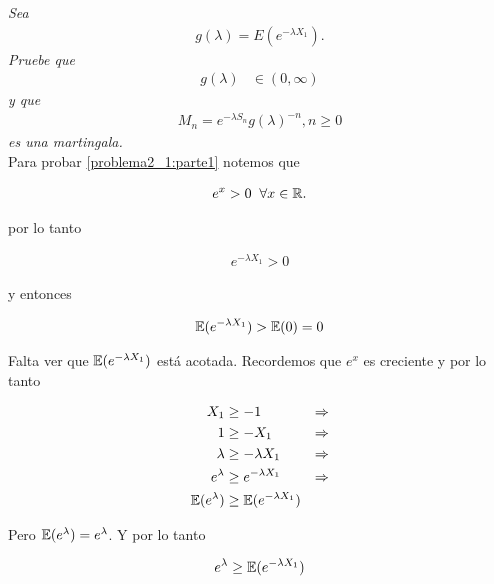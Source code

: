 \emph{
    Sea
        \begin{align}
                g(\lambda)=E(e^{- \lambda X_1}).
        \end{align} 
    Pruebe que 
    \null
        \begin{align}
                g(\lambda)    &\in (0,\infty)\label{problema2_1:parte1}
        \end{align}
    \null
    y que
    \null
        \begin{align}
                M_n=e^{-\lambda S_n}g(\lambda)^{-n},n\geq 0
        \end{align}
    \null
    es una martingala.\\
}
\afterstatement
    Para probar \eqref{problema2_1:parte1} notemos que

    \begin{align}
        e^x > 0 \;\; \forall x \in \mathbb{R}.
    \end{align}

    por lo tanto

    \begin{align}
        e^{-\lambda X_1} > 0
    \end{align}

    y entonces

    \begin{align}
        \mathbb{E}(e^{-\lambda X_1}) >\mathbb{E}(0) = 0
    \end{align}

    Falta ver que $\mathbb{E}(e^{-\lambda X_1})$ está acotada. Recordemos que $e^x$ es creciente y por lo tanto

    \begin{align}
        X_1                &\geq     -1                       & \Rightarrow\\
        1                  &\geq     - X_1                    & \Rightarrow\\
        \lambda            &\geq     - \lambda X_1            & \Rightarrow\\
        e^{\lambda}        &\geq     e^{- \lambda X_1}        & \Rightarrow\\
        \mathbb{E}(e^{\lambda})    &\geq     \mathbb{E}(e^{- \lambda X_1})
    \end{align}
    
    Pero $\mathbb{E}(e^{\lambda}) = e^{\lambda}$. Y por lo tanto
    
    \begin{align}
        e^{\lambda} \geq  \mathbb{E}(e^{- \lambda X_1})
    \end{align}    
    
